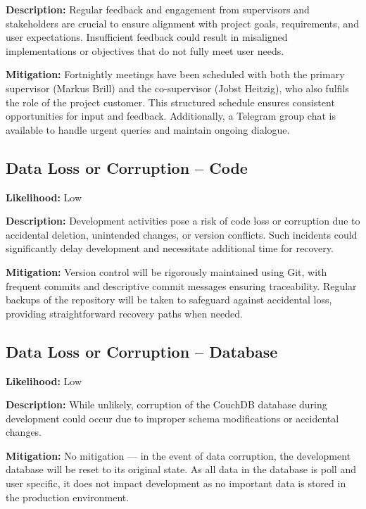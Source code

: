 \textbf{Description:} Regular feedback and engagement from supervisors and stakeholders are crucial to ensure alignment with project goals, requirements, and user expectations. Insufficient feedback could result in misaligned implementations or objectives that do not fully meet user needs.

\textbf{Mitigation:} Fortnightly meetings have been scheduled with both the primary supervisor (Markus Brill) and the co-supervisor (Jobst Heitzig), who also fulfils the role of the project customer. This structured schedule ensures consistent opportunities for input and feedback. Additionally, a Telegram group chat is available to handle urgent queries and maintain ongoing dialogue.

\subsection*{Data Loss or Corruption -- Code}

\textbf{Likelihood:} Low

\textbf{Description:} Development activities pose a risk of code loss or corruption due to accidental deletion, unintended changes, or version conflicts. Such incidents could significantly delay development and necessitate additional time for recovery.

\textbf{Mitigation:} Version control will be rigorously maintained using Git, with frequent commits and descriptive commit messages ensuring traceability. Regular backups of the repository will be taken to safeguard against accidental loss, providing straightforward recovery paths when needed.

\subsection*{Data Loss or Corruption -- Database}

\textbf{Likelihood:} Low

\textbf{Description:} While unlikely, corruption of the CouchDB database during development could occur due to improper schema modifications or accidental changes.

\textbf{Mitigation:} No mitigation --- in the event of data corruption, the development database will be reset to its original state. As all data in the database is poll and user specific, it does not impact development as no important data is stored in the production environment.


